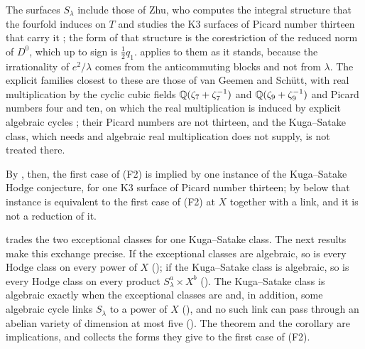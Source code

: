 \begin{remark}
The surfaces $S_{\lambda}$ include those of Zhu, who computes the integral
structure that the fourfold induces on $T$ and studies the K3 surfaces of
Picard number thirteen that carry it \cite{Zhu18}; the form of that structure
is the corestriction of the reduced norm of $D^{0}$, which up to sign is
$\frac12q_{1}$.  applies to them as it stands, because the
irrationality of $e^{2}/\lambda$ comes from the anticommuting blocks and not
from $\lambda$. The explicit families closest to these are those of van
Geemen and Sch\"utt, with
real multiplication by the cyclic cubic fields $\mathbb{Q}(\zeta_{7}+\zeta_{7}^{-1})$
and $\mathbb{Q}(\zeta_{9}+\zeta_{9}^{-1})$ and Picard numbers four and ten, on which
the real multiplication is induced by explicit algebraic cycles
\cite[Theorem~1.2 and Section~4.8]{vGS25}; their Picard numbers are not
thirteen, and the Kuga--Satake class, which  needs and
algebraic real multiplication does not supply, is not treated there.

By , then, the first case of (F2) is implied by one
instance of the Kuga--Satake Hodge conjecture, for one K3 surface of Picard
number thirteen; by  below that instance is
equivalent to the first case of (F2) at $X$ together with a link, and it is
not a reduction of it.
\end{remark}

 trades the two exceptional classes for one Kuga--Satake
class. The next results make this exchange precise. If the
exceptional classes are algebraic, so is every Hodge class on every power of
$X$ (); if the Kuga--Satake class is algebraic, so is
every Hodge class on every product $S_{\lambda}^{a}\times X^{b}$
(). The Kuga--Satake class is algebraic exactly
when the exceptional classes are and, in addition, some algebraic cycle links
$S_{\lambda}$ to a power of $X$ (), and no such link
can pass through an abelian variety of dimension at most five
(). The theorem and the corollary are
implications, and  collects the forms they give
to the first case of (F2).


